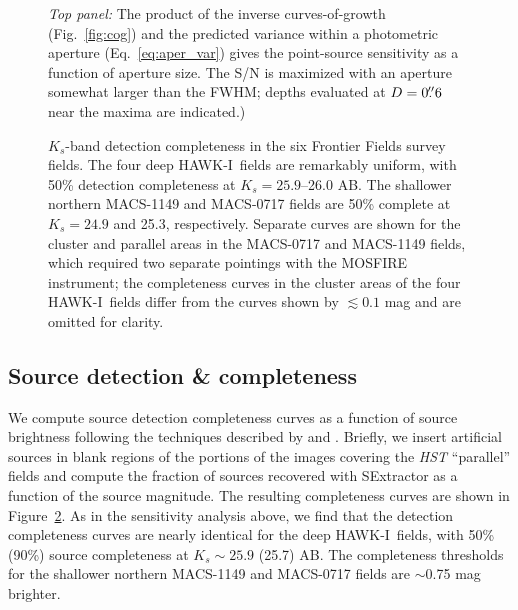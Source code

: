 \documentclass[preprint2]{aastex6}
\gdef\HAWKI{\mbox{HAWK-I}}
\begin{document}
\begin{figure}[!t]
\caption{\textit{Top panel:} The product of the inverse curves-of-growth (Fig.~\ref{fig:cog}) and the predicted variance within a photometric aperture (Eq.~\ref{eq:aper_var}) gives the point-source sensitivity as a function of aperture size.  The S/N is maximized with an aperture somewhat larger than the FWHM; depths evaluated at $D=0\mbox{$.\!\!^{\prime\prime}$}6$ near the maxima are indicated.)
\label{fig:depth}}  
\end{figure}

\begin{figure}[!t]
\caption{$K_s$-band detection completeness in the six Frontier Fields survey fields. The four deep \HAWKI\ fields are remarkably uniform, with 50\% detection completeness at $K_s=25.9$--26.0 AB.  The shallower northern MACS-1149 and MACS-0717 fields are 50\% complete at $K_s=24.9$ and 25.3, respectively.  Separate curves are shown for the cluster and parallel areas in the MACS-0717 and MACS-1149 fields, which required two separate pointings with the MOSFIRE instrument;  the completeness curves in the cluster areas of the four \HAWKI\ fields differ from the curves shown by $\lesssim0.1$ mag and are omitted for clarity.
\label{fig:completeness}}  
\end{figure}

\subsection{Source detection \& completeness}
\label{s:completeness}


We compute source detection completeness curves as a function of source brightness following the techniques described by \cite{whitaker:nmbs} and \cite{muzzin:13}.  Briefly, we insert artificial sources in blank regions of the portions of the images covering the \textit{HST} ``parallel'' fields and compute the fraction of sources recovered with SExtractor as a function of the source magnitude.  The resulting completeness curves are shown in Figure~\ref{fig:completeness}.   As in the sensitivity analysis above, we find that the detection completeness curves are nearly identical for the deep \HAWKI\ fields, with 50\% (90\%) source completeness at $K_s\sim25.9$ (25.7) AB.  The completeness thresholds for the shallower northern MACS-1149 and MACS-0717 fields are $\sim$0.75 mag brighter.
\end{document}
